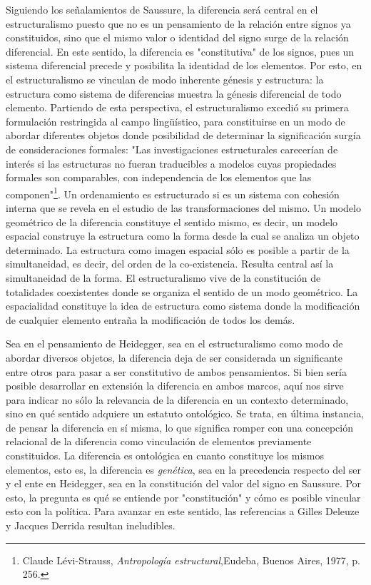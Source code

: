 \documentclass{book}
\begin{document}
Siguiendo los señalamientos de Saussure, la diferencia será central en
el estructuralismo puesto que no es un pensamiento de la relación entre
signos ya constituidos, sino que el mismo valor o identidad del signo
surge de la relación diferencial. En este sentido, la diferencia es
"constitutiva" de los signos, pues un sistema diferencial precede y
posibilita la identidad de los elementos. Por esto, en el
estructuralismo se vinculan de modo inherente génesis y estructura: la
estructura como sistema de diferencias muestra la génesis diferencial de
todo elemento. Partiendo de esta perspectiva, el estructuralismo excedió
su primera formulación restringida al campo lingüístico, para
constituirse en un modo de abordar diferentes objetos donde posibilidad
de determinar la significación surgía de consideraciones formales: "Las
investigaciones estructurales carecerían de interés si las estructuras
no fueran traducibles a modelos cuyas propiedades formales son
comparables, con independencia de los elementos que las
componen"\footnote{Claude Lévi-Strauss, \emph{Antropología
  estructural},Eudeba, Buenos Aires, 1977, p. 256.}. Un ordenamiento es
estructurado si es un sistema con cohesión interna que se revela en el
estudio de las transformaciones del mismo. Un modelo geométrico de la
diferencia constituye el sentido mismo, es decir, un modelo espacial
construye la estructura como la forma desde la cual se analiza un objeto
determinado. La estructura como imagen espacial sólo es posible a partir
de la simultaneidad, es decir, del orden de la co-existencia. Resulta
central así la simultaneidad de la forma. El estructuralismo vive de la
constitución de totalidades coexistentes donde se organiza el sentido de
un modo geométrico. La espacialidad constituye la idea de estructura
como sistema donde la modificación de cualquier elemento entraña la
modificación de todos los demás.

Sea en el pensamiento de Heidegger, sea en el estructuralismo como modo
de abordar diversos objetos, la diferencia deja de ser considerada un
significante entre otros para pasar a ser constitutivo de ambos
pensamientos. Si bien sería posible desarrollar en extensión la
diferencia en ambos marcos, aquí nos sirve para indicar no sólo la
relevancia de la diferencia en un contexto determinado, sino en qué
sentido adquiere un estatuto ontológico. Se trata, en última instancia,
de pensar la diferencia en sí misma, lo que significa romper con una
concepción relacional de la diferencia como vinculación de elementos
previamente constituidos. La diferencia es ontológica en cuanto
constituye los mismos elementos, esto es, la diferencia es
\emph{genética}, sea en la precedencia respecto del ser y el ente en
Heidegger, sea en la constitución del valor del signo en Saussure. Por
esto, la pregunta es qué se entiende por "constitución" y cómo es
posible vincular esto con la política. Para avanzar en este sentido, las
referencias a Gilles Deleuze y Jacques Derrida resultan ineludibles.
\end{document}

